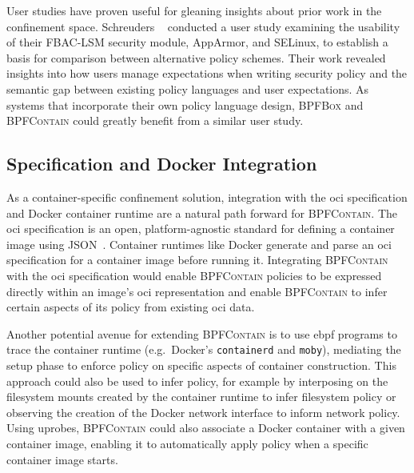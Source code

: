 \documentclass[
  fontsize=12pt,
  titlepage=firstiscover,
  paper=letter,
oneside,
  cleardoublepage=plain,
  parskip=half-,
  DIV=10,
  parindent,
  appendixprefix,
  chapterprefix,
  listof=totoc,
]{scrbook}
\newcommand{\bpfbox}{\textsc{BPFBox}}
\newcommand{\bpfcontain}{\textsc{BPFContain}}
\begin{document}
User studies have proven useful for gleaning insights about prior work in the
confinement space. Schreuders \etal~\cite{schreuders2012_towards} conducted a user study
examining the usability of their FBAC-LSM security module, AppArmor, and SELinux, to
establish a basis for comparison between alternative policy schemes. Their work revealed
insights into how users manage expectations when writing security policy and the semantic
gap between existing policy languages and user expectations. As systems that incorporate
their own policy language design, \bpfbox{} and \bpfcontain{} could greatly benefit from
a similar user study.















\subsection{ Specification and Docker Integration}\label{ss:disc-docker-integration}

As a container-specific confinement solution, integration with the \gls{oci} specification
and Docker container runtime are a natural path forward for \bpfcontain{}. The \gls{oci}
specification is an open, platform-agnostic standard for defining a container image using
JSON~\cite{oci}. Container runtimes like Docker generate and parse an \gls{oci}
specification for a container image before running it. Integrating \bpfcontain{} with the
\gls{oci} specification would enable \bpfcontain{} policies to be expressed directly
within an image's \gls{oci} representation and enable \bpfcontain{} to infer certain
aspects of its policy from existing \gls{oci} data.

Another potential avenue for extending \bpfcontain{} is to use \gls{ebpf} programs to
trace the container runtime (e.g.\ Docker's \texttt{containerd} and \texttt{moby}),
mediating the setup phase to enforce policy on specific aspects of container construction.
This approach could also be used to infer policy, for example by interposing on the
filesystem mounts created by the container runtime to infer filesystem policy or observing
the creation of the Docker network interface to inform network policy. Using uprobes,
\bpfcontain{} could also associate a Docker container with a given container image,
enabling it to automatically apply policy when a specific container image starts.
\end{document}
